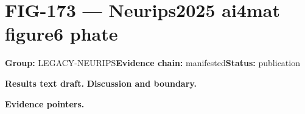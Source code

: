 \clearpage
\section{FIG-173 --- Neurips2025 ai4mat figure6 phate}
\label{figpage:fig-173}
\textbf{Group:} LEGACY-NEURIPS\quad \textbf{Evidence chain:} manifested\quad \textbf{Status:} publication

\textbf{Results text draft.} 
\textbf{Discussion and boundary.} 


\textbf{Evidence pointers.}



\vfill
